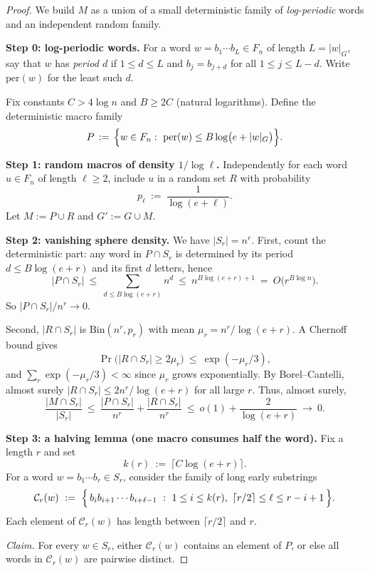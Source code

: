 \documentclass[12pt]{amsart}
\theoremstyle{definition}
\theoremstyle{remark}
\begin{document}
\begin{proof}
We build $M$ as a union of a small deterministic family of \emph{log-periodic} words
and an independent random family.

\medskip
\noindent\textbf{Step 0: log-periodic words.}
For a word $w=b_1\cdots b_L\in F_n$ of length $L=|w|_G$, say that $w$ has
\emph{period $d$} if $1\le d\le L$ and $b_j=b_{j+d}$ for all $1\le j\le L-d$.
Write $\mathrm{per}(w)$ for the least such $d$.

Fix constants $C>4\log n$ and $B\ge 2C$ (natural logarithms).
Define the deterministic macro family
\[
P \, :=\, \Bigl\{w\in F_n:\ \mathrm{per}(w)\le B\log\bigl(e+|w|_G\bigr)\Bigr\}.
\]

\medskip
\noindent\textbf{Step 1: random macros of density $1/\log \ell$.}
Independently for each word $u\in F_n$ of length $\ell\ge 2$, include $u$ in a random set $R$
with probability
\[
 p_\ell\ :=\ \frac{1}{\log(e+\ell)}.
\]
Let $M:=P\cup R$ and $G':=G\cup M$.

\medskip
\noindent\textbf{Step 2: vanishing sphere density.}
We have $|S_r|=n^r$.
First, count the deterministic part: any word in $P\cap S_r$ is determined by its period
$d\le B\log(e+r)$ and its first $d$ letters, hence
\[
|P\cap S_r|
\ \le\ \sum_{d\le B\log(e+r)} n^d
\ \le\ n^{B\log(e+r)+1}
\ =\ O\bigl(r^{B\log n}\bigr).
\]
So $|P\cap S_r|/n^r\to 0$.

Second, $|R\cap S_r|$ is $\mathrm{Bin}(n^r,p_r)$ with mean $\mu_r=n^r/\log(e+r)$.
A Chernoff bound gives
\[
\Pr\bigl(|R\cap S_r|\ge 2\mu_r\bigr)\ \le\ \exp(-\mu_r/3),
\]
and $\sum_r \exp(-\mu_r/3)<\infty$ since $\mu_r$ grows exponentially.
By Borel--Cantelli, almost surely $|R\cap S_r|\le 2n^r/\log(e+r)$ for all large $r$.
Thus, almost surely,
\[
\frac{|M\cap S_r|}{|S_r|}
\ \le\ \frac{|P\cap S_r|}{n^r}+\frac{|R\cap S_r|}{n^r}
\ \le\ o(1)+\frac{2}{\log(e+r)}
\ \longrightarrow\ 0.
\]

\medskip
\noindent\textbf{Step 3: a halving lemma (one macro consumes half the word).}
Fix a length $r$ and set
\[
 k(r)\ :=\ \lceil C\log(e+r)\rceil.
\]
For a word $w=b_1\cdots b_r\in S_r$, consider the family of long early substrings
\[
\mathcal{C}_r(w)\ :=\ \Bigl\{\, b_i b_{i+1}\cdots b_{i+\ell-1}\ :\
1\le i\le k(r),\ \lceil r/2\rceil\le \ell \le r-i+1 \,\Bigr\}.
\]
Each element of $\mathcal{C}_r(w)$ has length between $\lceil r/2\rceil$ and $r$.

\smallskip
\noindent\emph{Claim.}
For every $w\in S_r$, either $\mathcal{C}_r(w)$ contains an element of $P$,
or else all words in $\mathcal{C}_r(w)$ are pairwise distinct.


\end{proof}
\end{document}
